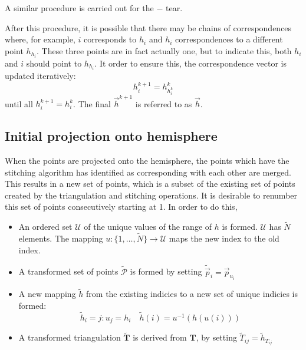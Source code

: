 \documentclass{article}
\begin{document}
A similar procedure is carried out for the $-$ tear.

After this procedure, it is possible that there may be chains of
correspondences where, for example, $i$ corresponds to $h_i$ and $h_i$
correspondences to a different point $h_{h_i}$. These three points are in
fact actually one, but to indicate this, both $h_i$ and $i$ should
point to $h_{h_i}$.  It order to ensure this, the correspondence
vector is updated iteratively:
\begin{displaymath}
  h^{k+1}_i = h^k_{h^k_i}  
\end{displaymath}
until all $h^{k+1}_i = h^k_i$. The final $\vec{h}^{k+1}$ is referred
to as $\vec{h}$.



\subsection{Initial projection onto hemisphere}
\label{fold-sphere:sec:proj-onto-hemisph}

When the points are projected onto the hemisphere, the points which
have the stitching algorithm has identified as corresponding with each
other are merged. This results in a new set of points, which is a
subset of the existing set of points created by the triangulation and
stitching operations. It is desirable to renumber this set of points
consecutively starting at 1. In order to do this, 
\begin{itemize}
\item An ordered set $\mathcal{U}$ of the unique values of the range
  of $h$ is formed. $\mathcal{U}$ has $\tilde N$ elements. The mapping
  $u: \{1,\dots, \tilde N\} \rightarrow \mathcal{U}$ maps the new index
  to the old index.
\item A transformed set of points $\mathcal{\tilde P}$ is formed by
  setting $\tilde{\vec{p}}_i = \vec{p}_{u_i}$
\item A new mapping $\tilde h$ from the existing indicies to a
  new set of unique indicies is formed:
  \begin{displaymath}
    \tilde h_i = j:u_j = h_i \quad
    \tilde h(i) = u^{-1}(h(u(i)))
  \end{displaymath}
\item A transformed triangulation $\tilde{\mathbf{T}}$ is derived from
  $\mathbf{T}$, by setting $\tilde{T}_{ij} = \tilde h_{T_{ij}}$
\end{itemize}
\end{document}

